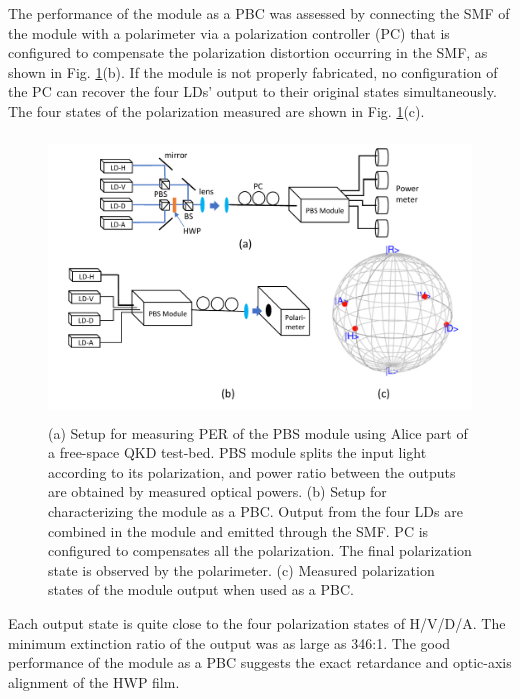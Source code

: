 \documentclass[letterpaper, 10pt]{article}
\begin{document}
The performance of the module as a PBC was assessed by connecting the SMF of the module with a polarimeter via a polarization controller (PC) that is configured to compensate the polarization distortion occurring in the SMF, as shown in Fig. \ref{fig:meas_setup}(b).
If the module is not properly fabricated, no configuration of the PC can recover the four LDs' output to their original states simultaneously.
The four states of the polarization measured are shown in Fig. \ref{fig:meas_setup}(c).
\begin{figure}
  \centering
  \includegraphics[height=7.5cm]{meas_setup}
  \caption{(a) Setup for measuring PER of the PBS module using Alice part of a free-space QKD test-bed. PBS module splits the input light according to its polarization, and power ratio between the outputs are obtained by measured optical powers.  (b) Setup for characterizing the module as a PBC. Output from the four LDs are combined in the module and emitted through the SMF. PC is configured to compensates all the polarization. The final polarization state  is observed by the polarimeter. (c) Measured polarization states of the module output when used as a PBC.}
  \label{fig:meas_setup}
\end{figure}
Each output state is quite close to the four polarization states of H/V/D/A.
The minimum extinction ratio of the output was as large as 346:1.
The good performance of the module as a PBC suggests the exact retardance and optic-axis alignment of the HWP film.
\end{document}
